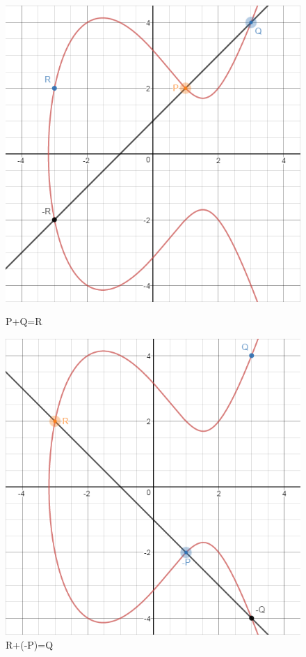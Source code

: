 \documentclass[a4paper,12pt]{tesiinfo}
\begin{document}
\begin{figure}[H]
 \begin{minipage}[H]{0.5\textwidth}
  \includegraphics[width=\textwidth, left]{PQR+}
  \caption{P+Q=R}
  \label{PQR+}
 \end{minipage}
 \begin{minipage}[H]{0.5\textwidth}
  \includegraphics[width=\textwidth, right]{PQR-}
  \caption{R+(-P)=Q}
  \label{PQR-}
 \end{minipage}
\end{figure}
\end{document}

